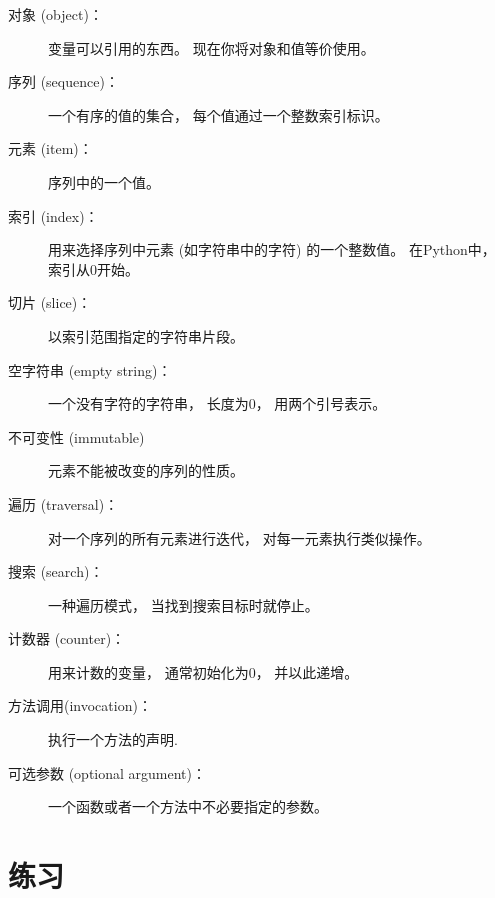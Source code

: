 \begin{description}

\item[对象 (object)：] 变量可以引用的东西。  现在你将对象和值等价使用。

\item[序列 (sequence)：] 一个有序的值的集合， 每个值通过一个整数索引标识。

\item[元素 (item)：] 序列中的一个值。

\item[索引 (index)：] 用来选择序列中元素 (如字符串中的字符) 的一个整数值。  在Python中， 索引从0开始。

\item[切片 (slice)：] 以索引范围指定的字符串片段。

\item[空字符串 (empty string)：] 一个没有字符的字符串， 长度为0， 用两个引号表示。

\item[不可变性 (immutable)] 元素不能被改变的序列的性质。

\item[遍历 (traversal)：] 对一个序列的所有元素进行迭代， 对每一元素执行类似操作。

\item[搜索 (search)：] 一种遍历模式， 当找到搜索目标时就停止。
  

\item[计数器 (counter)：] 用来计数的变量， 通常初始化为0， 并以此递增。

\item[方法调用(invocation)：] 执行一个方法的声明.

\item[可选参数 (optional argument)：] 一个函数或者一个方法中不必要指定的参数。
  

\end{description}


\section{练习}

